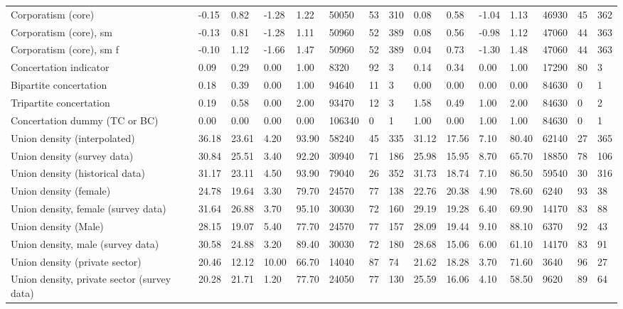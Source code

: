 \begin{longtable}{lllllllllllllll}
Corporatism (core) & -0.15 & 0.82 & -1.28 & 1.22 & 50050 & 53 & 310 & 0.08 & 0.58 & -1.04 & 1.13 & 46930 & 45 & 362\\
\addlinespace
Corporatism (core), sm & -0.13 & 0.81 & -1.28 & 1.11 & 50960 & 52 & 389 & 0.08 & 0.56 & -0.98 & 1.12 & 47060 & 44 & 363\\
Corporatism (core), sm f & -0.10 & 1.12 & -1.66 & 1.47 & 50960 & 52 & 389 & 0.04 & 0.73 & -1.30 & 1.48 & 47060 & 44 & 363\\
Concertation indicator & 0.09 & 0.29 & 0.00 & 1.00 & 8320 & 92 & 3 & 0.14 & 0.34 & 0.00 & 1.00 & 17290 & 80 & 3\\
Bipartite concertation & 0.18 & 0.39 & 0.00 & 1.00 & 94640 & 11 & 3 & 0.00 & 0.00 & 0.00 & 0.00 & 84630 & 0 & 1\\
Tripartite concertation & 0.19 & 0.58 & 0.00 & 2.00 & 93470 & 12 & 3 & 1.58 & 0.49 & 1.00 & 2.00 & 84630 & 0 & 2\\
\addlinespace
Concertation dummy (TC or BC) & 0.00 & 0.00 & 0.00 & 0.00 & 106340 & 0 & 1 & 1.00 & 0.00 & 1.00 & 1.00 & 84630 & 0 & 1\\
Union density (interpolated) & 36.18 & 23.61 & 4.20 & 93.90 & 58240 & 45 & 335 & 31.12 & 17.56 & 7.10 & 80.40 & 62140 & 27 & 365\\
Union density (survey data) & 30.84 & 25.51 & 3.40 & 92.20 & 30940 & 71 & 186 & 25.98 & 15.95 & 8.70 & 65.70 & 18850 & 78 & 106\\
Union density (historical data) & 31.17 & 23.11 & 4.50 & 93.90 & 79040 & 26 & 352 & 31.73 & 18.74 & 7.10 & 86.50 & 59540 & 30 & 316\\
Union density (female) & 24.78 & 19.64 & 3.30 & 79.70 & 24570 & 77 & 138 & 22.76 & 20.38 & 4.90 & 78.60 & 6240 & 93 & 38\\
\addlinespace
Union density, female (survey data) & 31.64 & 26.88 & 3.70 & 95.10 & 30030 & 72 & 160 & 29.19 & 19.28 & 6.40 & 69.90 & 14170 & 83 & 88\\
Union density (Male) & 28.15 & 19.07 & 5.40 & 77.70 & 24570 & 77 & 157 & 28.09 & 19.44 & 9.10 & 88.10 & 6370 & 92 & 43\\
Union density, male (survey data) & 30.58 & 24.88 & 3.20 & 89.40 & 30030 & 72 & 180 & 28.68 & 15.06 & 6.00 & 61.10 & 14170 & 83 & 91\\
Union density (private sector) & 20.46 & 12.12 & 10.00 & 66.70 & 14040 & 87 & 74 & 21.62 & 18.28 & 3.70 & 71.60 & 3640 & 96 & 27\\
Union density, private sector (survey data) & 20.28 & 21.71 & 1.20 & 77.70 & 24050 & 77 & 130 & 25.59 & 16.06 & 4.10 & 58.50 & 9620 & 89 & 64\\

\end{longtable}

